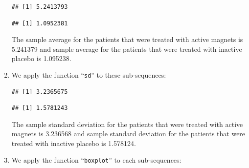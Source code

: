 \documentclass[]{krantz}
\makeatletter
\newenvironment{Shaded}{\begin{snugshade}}{\end{snugshade}}
\newcommand{\DecValTok}[1]{\textcolor[rgb]{0.00,0.00,0.81}{#1}}
\newcommand{\KeywordTok}[1]{\textcolor[rgb]{0.13,0.29,0.53}{\textbf{#1}}}
\newcommand{\NormalTok}[1]{#1}
\newcommand{\OperatorTok}[1]{\textcolor[rgb]{0.81,0.36,0.00}{\textbf{#1}}}
\newenvironment{kframe}{%
\medskip{}
\setlength{\fboxsep}{.8em}
 \def\at@end@of@kframe{}%
 \ifinner\ifhmode%
  \def\at@end@of@kframe{\end{minipage}}%
  \begin{minipage}{\columnwidth}%
 \fi\fi%
 \def\FrameCommand##1{\hskip\@totalleftmargin \hskip-\fboxsep
 \colorbox{shadecolor}{##1}\hskip-\fboxsep
     \hskip-\linewidth \hskip-\@totalleftmargin \hskip\columnwidth}%
 \MakeFramed {\advance\hsize-\width
   \@totalleftmargin\z@ \linewidth\hsize
   \@setminipage}}%
 {\par\unskip\endMakeFramed%
 \at@end@of@kframe}
\renewenvironment{Shaded}{\begin{kframe}}{\end{kframe}}
\theoremstyle{definition}
\theoremstyle{definition}
\theoremstyle{definition}
\theoremstyle{remark}
\makeatother
\begin{document}
\begin{enumerate}
\begin{verbatim}
## [1] 5.2413793
\end{verbatim}

\begin{Shaded}
\end{Shaded}

\begin{verbatim}
## [1] 1.0952381
\end{verbatim}

  The sample average for the patients that were treated with active
  magnets is 5.241379 and sample average for the patients that were
  treated with inactive placebo is 1.095238.
\item
  We apply the function ``\texttt{sd}'' to
  these sub-sequences:

\begin{Shaded}
\end{Shaded}

\begin{verbatim}
## [1] 3.2365675
\end{verbatim}

\begin{Shaded}
\end{Shaded}

\begin{verbatim}
## [1] 1.5781243
\end{verbatim}

  The sample standard deviation for the patients that were treated with
  active magnets is 3.236568 and sample standard deviation for the
  patients that were treated with inactive placebo is 1.578124.
\item
  We apply the function ``\texttt{boxplot}''
  to each sub-sequences:

\begin{Shaded}
\end{Shaded}


\end{enumerate}
\end{document}
